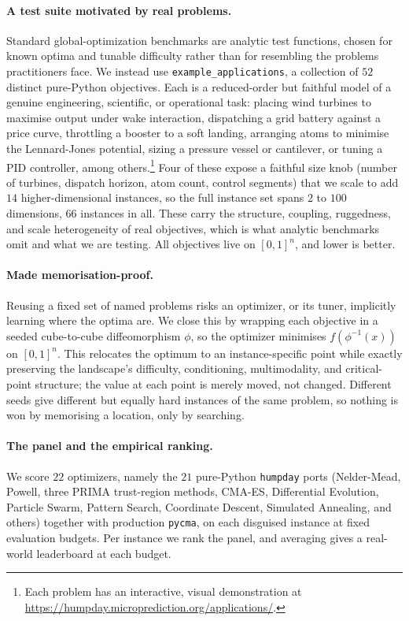 \documentclass[11pt]{article}
\begin{document}
\paragraph{A test suite motivated by real problems.}
Standard global-optimization benchmarks are analytic test functions, chosen for known
optima and tunable difficulty rather than for resembling the problems practitioners
face. We instead use \texttt{example\_applications}, a collection of $52$ distinct
pure-Python objectives. Each is a reduced-order but faithful model of a genuine
engineering, scientific, or operational task: placing wind turbines to maximise output
under wake interaction, dispatching a grid battery against a price curve, throttling a
booster to a soft landing, arranging atoms to minimise the Lennard-Jones potential,
sizing a pressure vessel or cantilever, or tuning a PID controller, among
others.\footnote{Each problem has an interactive, visual demonstration at
\url{https://humpday.microprediction.org/applications/}.} Four of these expose a
faithful size knob (number of turbines, dispatch horizon, atom count, control segments)
that we scale to add $14$ higher-dimensional instances, so the full instance set spans
$2$ to $100$ dimensions, $66$ instances in all. These carry the structure, coupling,
ruggedness, and scale heterogeneity of real objectives, which is what analytic
benchmarks omit and what we are testing. All objectives live on $[0,1]^n$, and lower is
better.

\paragraph{Made memorisation-proof.}
Reusing a fixed set of named problems risks an optimizer, or its tuner, implicitly
learning where the optima are. We close this by wrapping each objective in a seeded
cube-to-cube diffeomorphism $\phi$, so the optimizer minimises $f(\phi^{-1}(x))$ on
$[0,1]^n$. This relocates the optimum to an instance-specific point while exactly
preserving the landscape's difficulty, conditioning, multimodality, and critical-point
structure; the value at each point is merely moved, not changed. Different seeds give
different but equally hard instances of the same problem, so nothing is won by
memorising a location, only by searching.

\paragraph{The panel and the empirical ranking.}
We score $22$ optimizers, namely the $21$ pure-Python \texttt{humpday} ports
(Nelder-Mead, Powell, three PRIMA trust-region methods, CMA-ES, Differential Evolution,
Particle Swarm, Pattern Search, Coordinate Descent, Simulated Annealing, and others)
together with production \texttt{pycma}, on each disguised instance at fixed evaluation
budgets. Per instance we rank the panel, and averaging gives a real-world leaderboard at
each budget.
\end{document}
